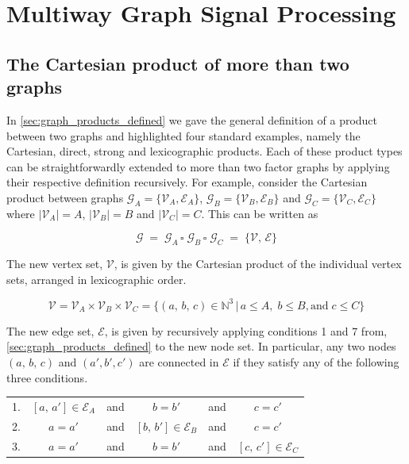 \section{Multiway Graph Signal Processing}

\label{sec:dd_gsp}

\subsection{The Cartesian product of more than two graphs}

In \cref{sec:graph_products_defined} we gave the general definition of a product between two graphs and highlighted four standard examples, namely the Cartesian, direct, strong and lexicographic products. Each of these product types can be straightforwardly extended to more than two factor graphs by applying their respective definition recursively. For example, consider the Cartesian product between graphs $\mathcal{G}_A = \{\mathcal{V}_A, \mathcal{E}_A\}$, $\mathcal{G}_B = \{\mathcal{V}_B, \mathcal{E}_B\}$ and $\mathcal{G}_C = \{\mathcal{V}_C, \mathcal{E}_C\}$ where $|\mathcal{V}_A| = A$, $|\mathcal{V}_B| = B$ and $|\mathcal{V}_C| = C$. This can be written as 

\begin{equation}
    \mathcal{G} \; = \; \mathcal{G}_A \, \square \; \mathcal{G}_B \, \square \; \mathcal{G}_C \; = \; \{\mathcal{V}, \, \mathcal{E}\}
\end{equation}

The new vertex set, $\mathcal{V}$, is given by the Cartesian product of the individual vertex sets, arranged in lexicographic order. 

\begin{equation}
    \mathcal{V} = \mathcal{V}_A \times \mathcal{V}_B \times \mathcal{V}_C = \{(a, \, b, \, c) \in \mathbb{N}^3 \, | \, a \leq A, \; b \leq B, \text{and} \;  c \leq C\}
\end{equation}

The new edge set, $\mathcal{E}$, is given by recursively applying conditions 1 and 7 from, \cref{sec:graph_products_defined} to the new node set. In particular, any two nodes $(a, \, b, \, c)$ and $(a', b', c')$ are connected in $\mathcal{E}$ if they satisfy any of the following three conditions. 

\vspace{0.5cm}

\begin{table}[h]
    \def\arraystretch{1.5}
    \centering
    \begin{tabular}{lclclc}
        1. & $[a, \, a'] \in \mathcal{E}_A$    & and & $b = b'$  & and & $c = c'$             \\
        2. & $a = a'$    & and & $[b, \, b'] \in \mathcal{E}_B$   & and & $c = c'$             \\
        3. & $a = a'$    & and & $b = b'$  & and & $[c, \, c'] \in \mathcal{E}_C$              \\
    \end{tabular}
\end{table}


